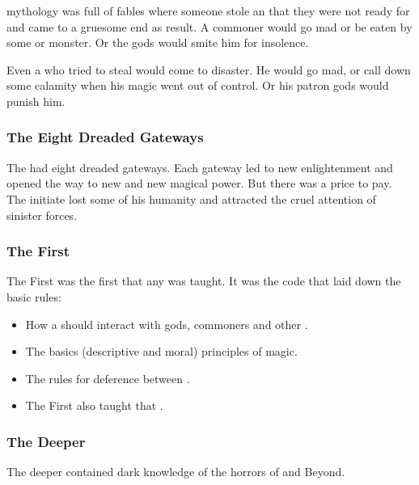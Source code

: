 \Ortaican mythology was full of fables where someone stole an \arcanum that they were not ready for and came to a gruesome end as result. 
A commoner would go mad or be eaten by some \daemon or monster.
Or the gods would smite him for insolence. 

Even a \rethyax who tried to steal \arcana would come to disaster.
He would go mad, or call down some calamity when his magic went out of control.
Or his patron gods would punish him. 





\subsubsection{The Eight Dreaded Gateways}
The \rethyaxes had eight dreaded gateways.
Each gateway led to new enlightenment and opened the way to new \arcana and new magical power.
But there was a price to pay.
The initiate lost some of his humanity and attracted the cruel attention of sinister forces.






\subsubsection{The First \Arcanum}
The First \Arcanum was the first \arcanum that any \rethyax was taught. 
It was the \rethyax code that laid down the basic rules:
\begin{itemize}
  \item How a \rethyax should interact with gods, commoners and other \rethyaxes.
  \item The basics (descriptive and moral) principles of magic.
  \item The rules for deference between \rethyaxes. 
  \item 
    The First \Arcanum also taught that . 
\end{itemize}





\subsubsection{The Deeper \Arcana}
The deeper \arcana contained dark knowledge of the horrors of \Miith and Beyond. 

